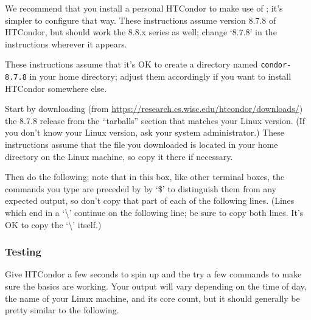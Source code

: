 We recommend that you install a personal HTCondor to make use of ;
it's simpler to configure that way.  These instructions assume version 8.7.8
of HTCondor, but should work the 8.8.x series as well; change `8.7.8' in
the instructions wherever it appears.

These instructions assume that it's OK to create a directory named
\texttt{condor-8.7.8} in your home directory; adjust them accordingly if you
want to install HTCondor somewhere else.

Start by downloading (from
\url{https://research.cs.wisc.edu/htcondor/downloads/}) the 8.7.8 release from
the ``tarballs'' section that matches your Linux version.  (If you don't know
your Linux version, ask your system administrator.)  These instructions assume
that the file you downloaded is located in your home directory on the Linux
machine, so copy it there if necessary.

Then do the following; note that in this box, like other terminal boxes,
the commands you type are preceded by by `\$' to distinguish them from any
expected output, so don't copy that part of each of the following lines.
(Lines which end in a `\textbackslash' continue on the following line; be
sure to copy both lines.  It's OK to copy the `\textbackslash' itself.)


\subsubsection{Testing}
\label{sec:clouds-user-guide-testing}

Give HTCondor a few seconds to spin up and the try a few commands to make sure
the basics are working.  Your output will vary depending on the time of day,
the name of your Linux machine, and its core count, but it should generally be
pretty similar to the following.

